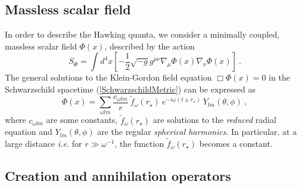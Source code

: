 \documentclass[aps,12pt,showpacs]{revtex4-2}
\def\rstar{r_{\star}}
\begin{document}
\subsection{Massless scalar field}

In order to describe the Hawking quanta, we consider a minimally coupled, 
massless scalar field $\Phi(x)$, described by the action
%
\begin{equation}\label{ScalarActionFull}
S_{\Phi} = \int d^{4}x \left[ -\frac{1}{2} \sqrt{-g} 
g^{\mu \nu} \nabla_{\mu}\Phi(x) \nabla_{\nu}\Phi(x) \right] ~.
\end{equation}
%
The general solutions to the Klein-Gordon field equation $\Box \Phi(x) = 0$ 
in the Schwarzschild spacetime (\ref{SchwarzschildMetric}) can be expressed as
%
\begin{equation}\label{ScalarFieldSolutionFull}
\Phi(x) = \sum_{\omega l m} \frac{c_{\omega lm}}{r}~ 
\tilde{f}_{\omega}(\rstar)~ e^{-i\omega(t\pm\rstar)} ~ Y_{lm}(\theta,\phi) ~,
\end{equation}
%
where $c_{\omega lm}$ are some constants, $\tilde{f}_{\omega}(\rstar)$ are 
solutions to the \emph{reduced} radial equation and $Y_{lm}(\theta,\phi)$ are 
the regular \emph{spherical harmonics}. In particular, at a large distance 
\emph{i.e.} for $r \gg \omega^{-1}$, the function $\tilde{f}_{\omega}(\rstar)$ 
becomes a constant.


\subsection{Creation and annihilation operators}
\end{document}
